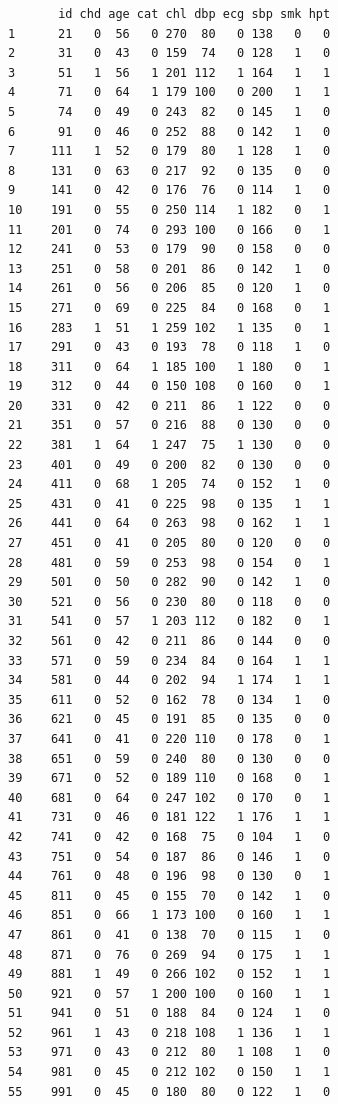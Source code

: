 \documentclass[
  letterpaper,
  DIV=11,
  numbers=noendperiod]{scrreprt}
\begin{document}
\begin{verbatim}
       id chd age cat chl dbp ecg sbp smk hpt
1      21   0  56   0 270  80   0 138   0   0
2      31   0  43   0 159  74   0 128   1   0
3      51   1  56   1 201 112   1 164   1   1
4      71   0  64   1 179 100   0 200   1   1
5      74   0  49   0 243  82   0 145   1   0
6      91   0  46   0 252  88   0 142   1   0
7     111   1  52   0 179  80   1 128   1   0
8     131   0  63   0 217  92   0 135   0   0
9     141   0  42   0 176  76   0 114   1   0
10    191   0  55   0 250 114   1 182   0   1
11    201   0  74   0 293 100   0 166   0   1
12    241   0  53   0 179  90   0 158   0   0
13    251   0  58   0 201  86   0 142   1   0
14    261   0  56   0 206  85   0 120   1   0
15    271   0  69   0 225  84   0 168   0   1
16    283   1  51   1 259 102   1 135   0   1
17    291   0  43   0 193  78   0 118   1   0
18    311   0  64   1 185 100   1 180   0   1
19    312   0  44   0 150 108   0 160   0   1
20    331   0  42   0 211  86   1 122   0   0
21    351   0  57   0 216  88   0 130   0   0
22    381   1  64   1 247  75   1 130   0   0
23    401   0  49   0 200  82   0 130   0   0
24    411   0  68   1 205  74   0 152   1   0
25    431   0  41   0 225  98   0 135   1   1
26    441   0  64   0 263  98   0 162   1   1
27    451   0  41   0 205  80   0 120   0   0
28    481   0  59   0 253  98   0 154   0   1
29    501   0  50   0 282  90   0 142   1   0
30    521   0  56   0 230  80   0 118   0   0
31    541   0  57   1 203 112   0 182   0   1
32    561   0  42   0 211  86   0 144   0   0
33    571   0  59   0 234  84   0 164   1   1
34    581   0  44   0 202  94   1 174   1   1
35    611   0  52   0 162  78   0 134   1   0
36    621   0  45   0 191  85   0 135   0   0
37    641   0  41   0 220 110   0 178   0   1
38    651   0  59   0 240  80   0 130   0   0
39    671   0  52   0 189 110   0 168   0   1
40    681   0  64   0 247 102   0 170   0   1
41    731   0  46   0 181 122   1 176   1   1
42    741   0  42   0 168  75   0 104   1   0
43    751   0  54   0 187  86   0 146   1   0
44    761   0  48   0 196  98   0 130   0   1
45    811   0  45   0 155  70   0 142   1   0
46    851   0  66   1 173 100   0 160   1   1
47    861   0  41   0 138  70   0 115   1   0
48    871   0  76   0 269  94   0 175   1   1
49    881   1  49   0 266 102   0 152   1   1
50    921   0  57   1 200 100   0 160   1   1
51    941   0  51   0 188  84   0 124   1   0
52    961   1  43   0 218 108   1 136   1   1
53    971   0  43   0 212  80   1 108   1   0
54    981   0  45   0 212 102   0 150   1   1
55    991   0  45   0 180  80   0 122   1   0

\end{verbatim}
\end{document}
